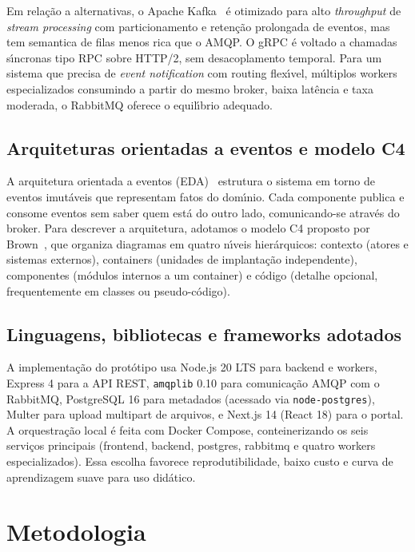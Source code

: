 \documentclass[10pt,a4paper]{article}
\begin{document}
Em rela\c{c}\~ao a alternativas, o Apache Kafka~\cite{kreps2011kafka} \'e otimizado para alto \emph{throughput} de \emph{stream processing} com particionamento e reten\c{c}\~ao prolongada de eventos, mas tem semantica de filas menos rica que o AMQP. O gRPC \'e voltado a chamadas s\'\i ncronas tipo RPC sobre HTTP/2, sem desacoplamento temporal. Para um sistema que precisa de \emph{event notification} com routing flex\'\i vel, m\'ultiplos workers especializados consumindo a partir do mesmo broker, baixa lat\^encia e taxa moderada, o RabbitMQ oferece o equil\'\i brio adequado.

\subsection{Arquiteturas orientadas a eventos e modelo C4}

A arquitetura orientada a eventos (EDA)~\cite{fowler2017eda,eda2020arch} estrutura o sistema em torno de eventos imut\'aveis que representam fatos do dom\'\i nio. Cada componente publica e consome eventos sem saber quem est\'a do outro lado, comunicando-se atrav\'es do broker. Para descrever a arquitetura, adotamos o modelo C4 proposto por Brown~\cite{brown2018c4}, que organiza diagramas em quatro n\'\i veis hier\'arquicos: contexto (atores e sistemas externos), containers (unidades de implanta\c{c}\~ao independente), componentes (m\'odulos internos a um container) e c\'odigo (detalhe opcional, frequentemente em classes ou pseudo-c\'odigo).

\subsection{Linguagens, bibliotecas e frameworks adotados}

A implementa\c{c}\~ao do prot\'otipo usa Node.js 20 LTS para backend e workers, Express 4 para a API REST, \texttt{amqplib} 0.10 para comunica\c{c}\~ao AMQP com o RabbitMQ, PostgreSQL 16 para metadados (acessado via \texttt{node-postgres}), Multer para upload multipart de arquivos, e Next.js 14 (React 18) para o portal. A orquestra\c{c}\~ao local \'e feita com Docker Compose, conteinerizando os seis servi\c{c}os principais (frontend, backend, postgres, rabbitmq e quatro workers especializados). Essa escolha favorece reprodutibilidade, baixo custo e curva de aprendizagem suave para uso did\'atico.

\section{Metodologia}
\end{document}
